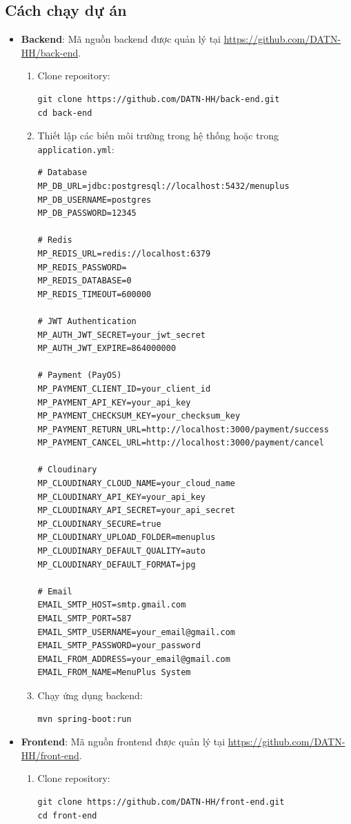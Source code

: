 \subsection{Cách chạy dự án}
\begin{itemize}
	\item \textbf{Backend}:  
	Mã nguồn backend được quản lý tại \url{https://github.com/DATN-HH/back-end}.  
	\begin{enumerate}
		\item Clone repository:
		\begin{verbatim}
git clone https://github.com/DATN-HH/back-end.git
cd back-end
		\end{verbatim}

		\item Thiết lập các biến môi trường trong hệ thống hoặc trong \texttt{application.yml}:
		\begin{verbatim}
# Database
MP_DB_URL=jdbc:postgresql://localhost:5432/menuplus
MP_DB_USERNAME=postgres
MP_DB_PASSWORD=12345

# Redis
MP_REDIS_URL=redis://localhost:6379
MP_REDIS_PASSWORD=
MP_REDIS_DATABASE=0
MP_REDIS_TIMEOUT=600000

# JWT Authentication
MP_AUTH_JWT_SECRET=your_jwt_secret
MP_AUTH_JWT_EXPIRE=864000000

# Payment (PayOS)
MP_PAYMENT_CLIENT_ID=your_client_id
MP_PAYMENT_API_KEY=your_api_key
MP_PAYMENT_CHECKSUM_KEY=your_checksum_key
MP_PAYMENT_RETURN_URL=http://localhost:3000/payment/success
MP_PAYMENT_CANCEL_URL=http://localhost:3000/payment/cancel

# Cloudinary
MP_CLOUDINARY_CLOUD_NAME=your_cloud_name
MP_CLOUDINARY_API_KEY=your_api_key
MP_CLOUDINARY_API_SECRET=your_api_secret
MP_CLOUDINARY_SECURE=true
MP_CLOUDINARY_UPLOAD_FOLDER=menuplus
MP_CLOUDINARY_DEFAULT_QUALITY=auto
MP_CLOUDINARY_DEFAULT_FORMAT=jpg

# Email
EMAIL_SMTP_HOST=smtp.gmail.com
EMAIL_SMTP_PORT=587
EMAIL_SMTP_USERNAME=your_email@gmail.com
EMAIL_SMTP_PASSWORD=your_password
EMAIL_FROM_ADDRESS=your_email@gmail.com
EMAIL_FROM_NAME=MenuPlus System
		\end{verbatim}

		\item Chạy ứng dụng backend:
		\begin{verbatim}
mvn spring-boot:run
		\end{verbatim}
	\end{enumerate}

	\item \textbf{Frontend}:  
	Mã nguồn frontend được quản lý tại \url{https://github.com/DATN-HH/front-end}.  
	\begin{enumerate}
		\item Clone repository:
		\begin{verbatim}
git clone https://github.com/DATN-HH/front-end.git
cd front-end
		\end{verbatim}


\end{enumerate}
\end{itemize}
